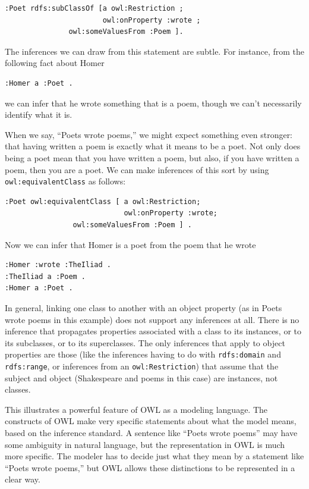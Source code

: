 \begin{lstlisting}
:Poet rdfs:subClassOf [a owl:Restriction ;
                       owl:onProperty :wrote ;
		       owl:someValuesFrom :Poem ].
\end{lstlisting}

The inferences we can draw from this statement are subtle. For instance,
from the following fact about Homer

\begin{lstlisting}
:Homer a :Poet .
\end{lstlisting}

we can infer that he wrote something that is a poem, though we can't
necessarily identify what it is.

When we say, ``Poets wrote poems,'' we might expect something even
stronger: that having written a poem is exactly what it means to be a
poet. Not only does being a poet mean that you have written a poem, but
also, if you have written a poem, then you are a poet. We can make
inferences of this sort by using \texttt{owl:equivalentClass} as follows:

\begin{lstlisting}
:Poet owl:equivalentClass [ a owl:Restriction;
                            owl:onProperty :wrote;
			    owl:someValuesFrom :Poem ] .
\end{lstlisting}

Now we can infer that Homer is a poet from the poem that he wrote

\begin{lstlisting}
:Homer :wrote :TheIliad .
:TheIliad a :Poem .
:Homer a :Poet .
\end{lstlisting}

In general, linking one class to another with an object property (as in
Poets wrote poems in this example) does not support any inferences at
all. There is no inference that propagates properties associated with a
class to its instances, or to its subclasses, or to its superclasses.
The only inferences that apply to object properties are those (like the
inferences having to do with \texttt{rdfs:domain} and \texttt{rdfs:range}, or inferences
from an \texttt{owl:Restriction}) that assume that the subject and object
(Shakespeare and poems in this case) are instances, not classes.

This illustrates a powerful feature of OWL as a modeling language. The
constructs of OWL make very specific statements about what the model
means, based on the inference standard. A sentence like ``Poets wrote
poems'' may have some ambiguity in natural language, but the
representation in OWL is much more specific. The modeler has to decide
just what they mean by a statement like ``Poets wrote poems,'' but OWL
allows these distinctions to be represented in a clear way.

